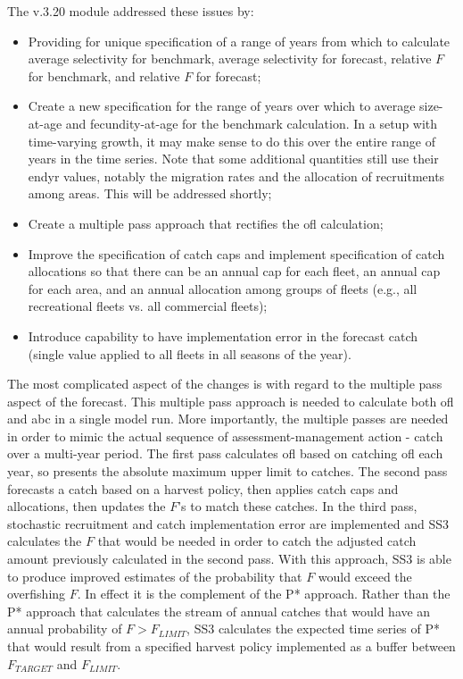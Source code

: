 The v.3.20 module addressed these issues by:
\begin{itemize}
	\item Providing for unique specification of a range of years from which to calculate average selectivity for benchmark, average selectivity for forecast, relative $F$ for benchmark, and relative $F$ for forecast;
	\item Create a new specification for the range of years over which to average size-at-age and fecundity-at-age for the benchmark calculation. In a setup with time-varying growth, it may make sense to do this over the entire range of years in the time series. Note that some additional quantities still use their endyr values, notably the migration rates and the allocation of recruitments among areas. This will be addressed shortly;
	\item Create a multiple pass approach that rectifies the \gls{ofl} calculation;
	\item Improve the specification of catch caps and implement specification of catch allocations so that there can be an annual cap for each fleet, an annual cap for each area, and an annual allocation among groups of fleets (e.g., all recreational fleets vs. all commercial fleets);
	\item Introduce capability to have implementation error in the forecast catch (single value applied to all fleets in all seasons of the year).
\end{itemize}

The most complicated aspect of the changes is with regard to the multiple pass aspect of the forecast. This multiple pass approach is needed to calculate both \gls{ofl} and \gls{abc} in a single model run. More importantly, the multiple passes are needed in order to mimic the actual sequence of assessment-management action - catch over a multi-year period. The first pass calculates \gls{ofl} based on catching \gls{ofl} each year, so presents the absolute maximum upper limit to catches. The second pass forecasts a catch based on a harvest policy, then applies catch caps and allocations, then updates the $F$'s to match these catches. In the third pass, stochastic recruitment and catch implementation error are implemented and SS3 calculates the $F$ that would be needed in order to catch the adjusted catch amount previously calculated in the second pass. With this approach, SS3 is able to produce improved estimates of the probability that $F$ would exceed the overfishing $F$. In effect it is the complement of the P* approach. Rather than the P* approach that calculates the stream of annual catches that would have an annual probability of $F > F_{LIMIT}$, SS3 calculates the expected time series of P* that would result from a specified harvest policy implemented as a buffer between $F_{TARGET}$ and $F_{LIMIT}$.

